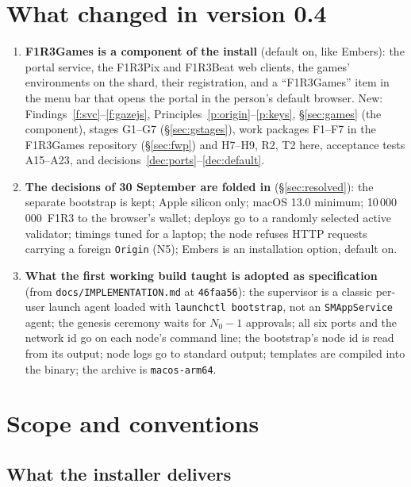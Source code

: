 \documentclass[11pt]{article}
\theoremstyle{definition}
\theoremstyle{remark}
\newcommand{\code}[1]{\texttt{#1}}
\newcommand{\Gm}{F1R3Games}
\newcommand{\Em}{Embers}
\begin{document}
\section{What changed in version 0.4}\label{sec:changes}

\begin{enumerate}[itemsep=2pt]
\item \textbf{\Gm{} is a component of the install} (default on, like \Em{}): the
  portal service, the F1R3Pix and F1R3Beat web clients, the games' environments on
  the shard, their registration, and a ``F1R3Games'' item in the menu bar that opens
  the portal in the person's default browser. New: Findings~\ref{f:svc}--\ref{f:gazejs},
  Principles~\ref{p:origin}--\ref{p:keys}, \S\ref{sec:games} (the component),
  stages G1--G7 (\S\ref{sec:gstages}), work packages F1--F7 in the \Gm{} repository
  (\S\ref{sec:fwp}) and H7--H9, R2, T2 here, acceptance tests A15--A23, and
  decisions~\ref{dec:ports}--\ref{dec:default}.
\item \textbf{The decisions of 30 September are folded in} (\S\ref{sec:resolved}):
  the separate bootstrap is kept; Apple silicon only; macOS 13.0 minimum;
  10\,000\,000~F1R3 to the browser's wallet; deploys go to a randomly selected active
  validator; timings tuned for a laptop; the node refuses HTTP requests carrying a
  foreign \code{Origin} (N5); \Em{} is an installation option, default on.
\item \textbf{What the first working build taught is adopted as specification}
  (from \code{docs/IMPLEMENTATION.md} at \code{46faa56}): the supervisor is a classic
  per-user launch agent loaded with \code{launchctl bootstrap}, not an
  \code{SMAppService} agent; the genesis ceremony waits for $N_0 - 1$ approvals; all
  six ports and the network id go on each node's command line; the bootstrap's node
  id is read from its output; node logs go to standard output; templates are compiled
  into the binary; the archive is \code{macos-arm64}.
\end{enumerate}

\section{Scope and conventions}\label{sec:scope}

\subsection{What the installer delivers}
\end{document}
